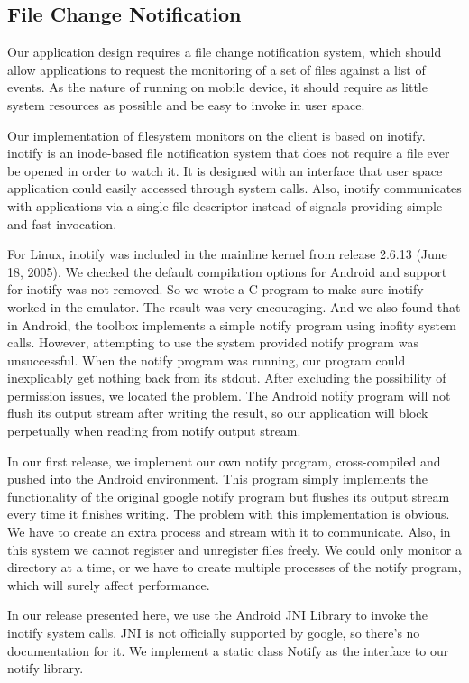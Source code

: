 \subsection{File Change Notification}
Our application design requires a file change notification system, which should allow applications to request 
the monitoring of a set of files against a list of events. As the nature of running on mobile device, it should 
require as little system resources as possible and be easy to invoke in user space. 

Our implementation of filesystem monitors on the client is based on inotify. inotify is an inode-based file notification system 
that does not require a file ever be opened in order to watch it. It is designed with an interface that user space 
application could easily accessed through system calls. Also, inotify communicates with applications via a single 
file descriptor instead of signals providing simple and fast invocation.

For Linux, inotify was included in the mainline kernel from release 2.6.13 (June 18, 2005)\cite{Love:2005p1294}. We 
checked the default compilation options for Android and support for inotify was not removed. So we wrote a 
C program to make sure inotify worked in the emulator. The result was very encouraging. And we also found that in Android, 
the toolbox implements a simple notify program using inofity system calls. However, attempting to use the 
system provided notify program was unsuccessful. When the notify program was running, our program could inexplicably get nothing back from 
its stdout. After excluding the possibility of permission issues, we located the problem. The Android notify program will 
not flush its output stream after writing the result, so our application will block perpetually when reading from notify output stream. 

In our first release, we implement our own notify program, cross-compiled and pushed into the Android environment. This 
program simply implements the functionality of the original google notify program but flushes its output 
stream every time it finishes writing. The problem with this implementation is obvious. We have to create an extra process 
and stream with it to communicate. Also, in this system we cannot register and unregister files freely. 
We could only monitor a directory at a time, or we have to create multiple processes of the notify program, which will 
surely affect performance. 

In our release presented here, we use the Android JNI Library to invoke the inotify system calls. JNI is not officially 
supported by google, so there's no documentation for it. We implement a static class Notify as the interface to our 
notify library. 

